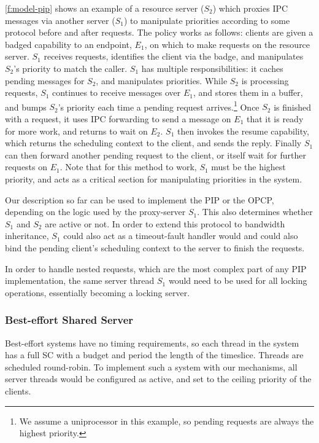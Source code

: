 \cref{f:model-pip} shows an example of a resource server ($S_{2}$) which proxies \gls{IPC} messages via
another server ($S_{1}$) to manipulate priorities according to some protocol before and after
requests. The policy works as follows: clients are given a badged capability to an endpoint,
$E_{1}$, on which to make requests on the resource server. $S_{1}$ receives requests, identifies 
the client via the badge, and manipulates $S_{2}$'s priority to match the caller. $S_{1}$ has
multiple responsibilities: it caches pending messages for $S_{2}$, and manipulates priorities.
While $S_{2}$ is processing requests, $S_{1}$ continues to receive messages over $E_{1}$, and stores
them in a buffer, and bumps $S_{2}$'s priority each time a pending request arrives.\footnote{We
assume a uniprocessor in this example, so pending requests are always the highest priority.}
Once $S_{2}$ is finished with a request, it uses \gls{IPC} forwarding to send a
message on $E_{1}$ that it is ready for more work, and returns to wait on $E_{2}$.
$S_{1}$ then invokes the resume capability, which returns the scheduling context to the client, and
sends the reply. Finally $S_{1}$ can then forward another pending request to the client, or itself
wait for further requests on $E_{1}$. Note that for this
method to work, $S_{1}$ must be the highest priority, and acts as a critical section for
manipulating priorities in the system. 

Our description so far can be used to implement the \gls{PIP} or the \gls{OPCP}, depending on 
the logic used by the proxy-server $S_{1}$. This also determines whether $S_{1}$ and $S_{2}$ are active or
not. In order to extend this protocol to bandwidth inheritance, $S_{1}$ could also act as a timeout-fault
handler would and could also bind the pending client's scheduling
context to the server to finish the requests. 

In order to handle nested requests, which are the most complex part of any \gls{PIP} implementation,
the same server thread $S_{1}$ would need to be used for all locking operations, essentially
becoming a locking server.

\subsubsection{Best-effort Shared Server}
\label{sec:best-effort}

Best-effort systems have no timing requirements, so each thread in the system has a full \gls{SC}
with a budget and period the length of the timeslice. Threads are scheduled round-robin. To
implement such a system with our mechanisms, all server threads would be configured as active, and 
set to the ceiling priority of the clients. 

